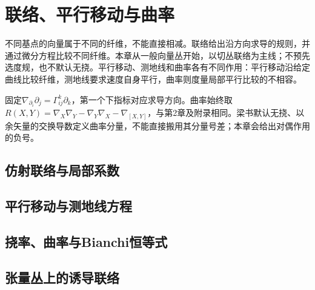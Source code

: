 \chapter{联络、平行移动与曲率}
\label{ch:10-connections}

不同基点的向量属于不同的纤维，不能直接相减。联络给出沿方向求导的规则，并通过微分方程比较不同纤维。本章从一般向量丛开始，以切丛联络为主线；不预先选度规，也不默认无挠。平行移动、测地线和曲率各有不同作用：平行移动沿给定曲线比较纤维，测地线要求速度自身平行，曲率则度量局部平行比较的不相容。

固定$\nabla_{\partial_i}\partial_j=\Gamma^k_{ij}\partial_k$，第一个下指标对应求导方向。曲率始终取$R(X,Y)=\nabla_X\nabla_Y-\nabla_Y\nabla_X-\nabla_{[X,Y]}$，与第2章及附录相同。梁书默认无挠、以余矢量的交换导数定义曲率分量，不能直接搬用其分量号差；本章会给出对偶作用的负号。

\section{仿射联络与局部系数}


\section{平行移动与测地线方程}


\section{挠率、曲率与Bianchi恒等式}


\section{张量丛上的诱导联络}



